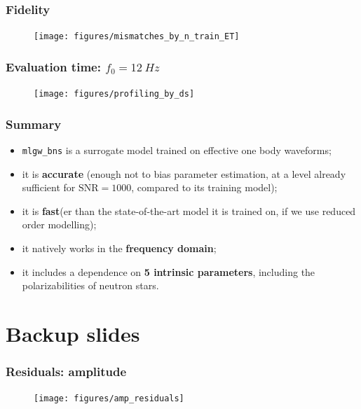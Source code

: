 \documentclass{beamer}
\begin{document}
\begin{frame}
    \frametitle{Fidelity}
    \begin{figure}[ht]
    \centering
    \texttt{[image: figures/mismatches\_by\_n\_train\_ET]}
    \end{figure}
\end{frame}

\begin{frame}
    \frametitle{Evaluation time: \(f_0 = \SI{12}{Hz}\)}    
    \begin{figure}[ht]
    \centering
    \vspace*{-.25cm}
    \texttt{[image: figures/profiling\_by\_ds]}
    \label{fig:profiling_by_ds}
    \end{figure}
\end{frame}

\begin{frame}
    \frametitle{Summary}
    \begin{itemize}
        \item \texttt{mlgw\_bns} is a surrogate model trained on effective one body waveforms;
        \item it is \textbf{accurate} (enough not to bias parameter estimation, at a level already sufficient for \(\text{SNR} = 1000\), compared to its training model);
        \item it is \textbf{fast}(er than the state-of-the-art model it is trained on, if we use reduced order modelling);
        \item it natively works in the \textbf{frequency domain};
        \item it includes a dependence on \textbf{5 intrinsic parameters}, including the polarizabilities of neutron stars.
    \end{itemize}
\end{frame}

\section{Backup slides}

\begin{frame}
    \frametitle{Residuals: amplitude}
    \begin{figure}[ht]
    \centering
    \texttt{[image: figures/amp\_residuals]}
    \label{fig:amp_residuals}
    \end{figure}
\end{frame}
\end{document}
